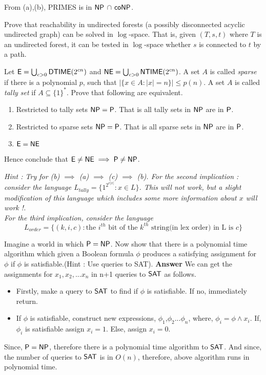 \documentclass[addpoints,12pt]{exam}
\begin{document}
\begin{questions}
From (a),(b), PRIMES is in $\NP$ $\cap$ $\co\NP$.

\question[10] Prove that reachability in undirected forests (a possibly disconnected acyclic undirected graph) can be solved in $\log$-space. That is, given $(T,s,t)$ where $T$ is an undirected forest, it can be tested in $\log$-space whether $s$ is connected to $t$ by a path.

\question[18]
Let $\E = \bigcup_{c > 0} \DTIME(2^{cn})$ and $\NE = \bigcup_{c > 0} \NTIME(2^{cn})$. A set $A$ is called {\em sparse} if there is a polynomial $p$,
    such that $|\{ x \in A : |x| = n \}| \le p(n)$. A set $A$ is called
    {\em tally set} if $A \subseteq \{1\}^*$.  Prove that following
    are equivalent.
  \begin{enumerate}
  \item Restricted to tally sets $\NP = \P$. That is all tally sets in $\NP$ are in $\P$.
  \item Restricted to sparse sets $\NP = \P$. That is all sparse sets
    in $\NP$ are in $\P$.
  \item $\E = \NE$
  \end{enumerate}
  Hence conclude that $\E \ne \NE \implies \P \ne \NP$.
  
  \emph{Hint : Try for (b) $\implies$ (a) $\implies$ (c) $\implies$ (b). 
  For the second implication : consider the language $L_{tally} = \{1^{2^{c|x|}} : x \in L\}$.
  This will not work, but a slight modification of this language which includes some more information about 
  $x$ will work !. \\ For the third implication, consider the language 
\[ L_{order} = \{(k,i,c): \textrm{the $i^{th}$ bit of the $k^{th}$ string(in lex order) in L is $c$} \} \] }

\question[7] 
Imagine a world in which $\P = \NP$. Now show that there is a
polynomial time algorithm which given a Boolean formula $\phi$ produces a satisfying assignment for $\phi$ if $\phi$ is satisfiable.(Hint : Use queries to SAT).
\newline
\textbf{Answer}\newline
We can get the assignments for $x_{1},x_{2},...x_{n}$ in n+1 queries to $\SAT$ as follows.
\begin{itemize}
 \item Firstly, make a query to $\SAT$ to find if $\phi$ is satisfiable. If no, immediately return.
 \item If $\phi$ is satisfiable, construct new expressions, $\phi_{1}$,$\phi_{2}$...$\phi_{n}$, where,
    $\phi_{i}=\phi \wedge x_{i}$.\newline
    If, $\phi_{i}$ is satisfiable assign $x_{i}=1$. Else, assign $x_{i}=0$.
\end{itemize}

Since, $\P = \NP$, therefore there is a polynomial time algorithm to $\SAT$. And since, the number of queries to $\SAT$ is in $O(n)$, therefore,
above algorithm runs in polynomial time.



\end{questions}
\end{document}
